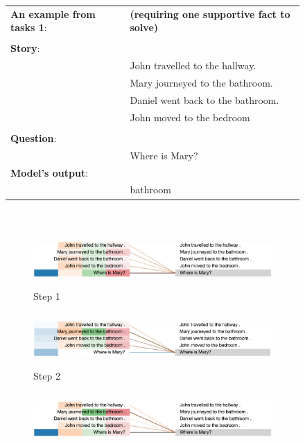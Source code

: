\begin{figure}[!ht]
\begin{minipage}{\textwidth}
\fontsize{8}{8}\selectfont
\begin{tabular}{l l}
\textbf{An example from tasks 1}: & \textbf{(requiring one supportive fact to solve)}\\
\\
\textbf{Story}: & \\
& John travelled to the hallway. \\
& Mary journeyed to the bathroom. \\
& Daniel went back to the bathroom. \\
& John moved to the bedroom \\
\\
\textbf{Question}: & \\
& Where is Mary? \\
\textbf{Model's output}: & \\
& bathroom
\end{tabular}
\end{minipage}
\\ \vfill
\vspace{20pt} %
\begin{minipage}{\textwidth}
    \centering
    \begin{subfigure}[t]{\textwidth}
        \centering
        \includegraphics[height=0.8in]{04-part-03/chapter-06/figs_and_tables/figs_attention_babi/e1-step1.png}
        \caption{Step 1}
    \end{subfigure}%
    \hfill \hfill
    \begin{subfigure}[t]{\textwidth}
        \centering
        \includegraphics[height=0.8in]{04-part-03/chapter-06/figs_and_tables/figs_attention_babi/e1-step2}
        \caption{Step 2}
    \end{subfigure}
    \hfill \hfill
    \begin{subfigure}[t]{\textwidth}
        \centering
        \includegraphics[height=0.8in]{04-part-03/chapter-06/figs_and_tables/figs_attention_babi/e1-step3}

\end{subfigure}
\end{minipage}
\end{figure}
